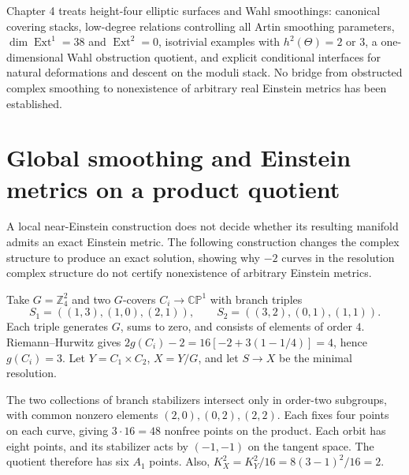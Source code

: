 \documentclass[a4paper,11pt]{article}
\numberwithin{equation}{section}
\theoremstyle{definition}
\newcommand{\CP}{\mathbb{CP}}
\newcommand{\Z}{\mathbb Z}
\begin{document}
Chapter 4 treats height-four elliptic surfaces and Wahl smoothings: canonical covering stacks, low-degree relations controlling all Artin smoothing parameters, $\dim\operatorname{Ext}^1=38$ and $\operatorname{Ext}^2=0$, isotrivial examples with $h^2(\Theta)=2$ or $3$, a one-dimensional Wahl obstruction quotient, and explicit conditional interfaces for natural deformations and descent on the moduli stack. No bridge from obstructed complex smoothing to nonexistence of arbitrary real Einstein metrics has been established.

\section{Global smoothing and Einstein metrics on a product quotient}
A local near-Einstein construction does not decide whether its resulting manifold admits an exact Einstein metric.
The following construction changes the complex structure to produce an exact solution, showing why $-2$ curves in the resolution complex structure do not certify nonexistence of arbitrary Einstein metrics.

Take $G=\Z_4^2$ and two $G$-covers $C_i\to\CP^1$ with branch triples
\[
S_1=((1,3),(1,0),(2,1)),\qquad
S_2=((3,2),(0,1),(1,1)).
\]
Each triple generates $G$, sums to zero, and consists of elements of order $4$.
Riemann--Hurwitz gives
$2g(C_i)-2=16[-2+3(1-1/4)]=4$, hence $g(C_i)=3$.
Let $Y=C_1\times C_2$, $X=Y/G$, and let $S\to X$ be the minimal resolution.

The two collections of branch stabilizers intersect only in order-two subgroups, with common nonzero elements
$(2,0),(0,2),(2,2)$. Each fixes four points on each curve,
giving $3\cdot16=48$ nonfree points on the product.
Each orbit has eight points, and its stabilizer acts by $(-1,-1)$ on the tangent space. The quotient therefore has six $A_1$ points.
Also, $K_X^2=K_Y^2/16=8(3-1)^2/16=2$.
\end{document}
